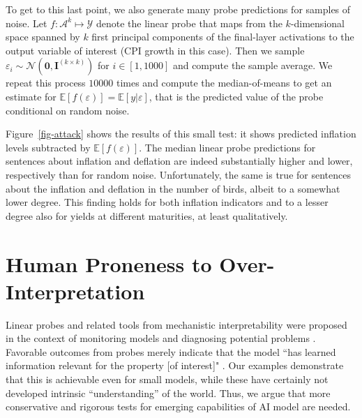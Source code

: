 \documentclass{article}
\theoremstyle{plain}
\theoremstyle{definition}
\theoremstyle{remark}
\begin{document}
To get to this last point, we also generate many probe predictions for samples of noise. Let \(f: \mathcal{A}^k \mapsto \mathcal{Y}\) denote the linear probe that maps from the \(k\)-dimensional space spanned by \(k\) first principal components of the final-layer activations to the output variable of interest (CPI growth in this case). Then we sample \(\varepsilon_i \sim \mathcal{N}(\mathbf{0},\mathbf{I}^{(k \times k)})\) for \(i \in [1,1000]\) and compute the sample average. We repeat this process \(10000\) times and compute the median-of-means to get an estimate for \(\mathbb{E}[f(\varepsilon)]=\mathbb{E}[y|\varepsilon]\), that is the predicted value of the probe conditional on random noise.

Figure~\ref{fig-attack} shows the results of this small test: it shows predicted inflation levels subtracted by \(\mathbb{E}[f(\varepsilon)]\). The median linear probe predictions for sentences about inflation and deflation are indeed substantially higher and lower, respectively than for random noise. Unfortunately, the same is true for sentences about the inflation and deflation in the number of birds, albeit to a somewhat lower degree. This finding holds for both inflation indicators and to a lesser degree also for yields at different maturities, at least qualitatively.

\section{Human Proneness to Over-Interpretation}

Linear probes and related tools from mechanistic interpretability were proposed in the context of monitoring models and diagnosing potential problems \citep{alain2018understanding}. Favorable outcomes from probes merely indicate that the model ``has learned information relevant for the property [of interest]" \citep{belinkov2021probing}. Our examples demonstrate that this is achievable even for small models, while these have certainly not developed intrinsic ``understanding'' of the world. Thus, 
we argue that more conservative and rigorous tests for emerging capabilities of AI model are needed.

\end{document}
